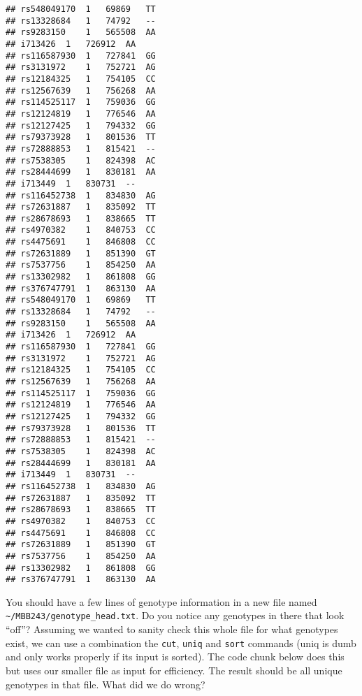 \documentclass[
]{article}
\begin{document}
\begin{verbatim}
## rs548049170  1   69869   TT
## rs13328684   1   74792   --
## rs9283150    1   565508  AA
## i713426  1   726912  AA
## rs116587930  1   727841  GG
## rs3131972    1   752721  AG
## rs12184325   1   754105  CC
## rs12567639   1   756268  AA
## rs114525117  1   759036  GG
## rs12124819   1   776546  AA
## rs12127425   1   794332  GG
## rs79373928   1   801536  TT
## rs72888853   1   815421  --
## rs7538305    1   824398  AC
## rs28444699   1   830181  AA
## i713449  1   830731  --
## rs116452738  1   834830  AG
## rs72631887   1   835092  TT
## rs28678693   1   838665  TT
## rs4970382    1   840753  CC
## rs4475691    1   846808  CC
## rs72631889   1   851390  GT
## rs7537756    1   854250  AA
## rs13302982   1   861808  GG
## rs376747791  1   863130  AA
## rs548049170  1   69869   TT
## rs13328684   1   74792   --
## rs9283150    1   565508  AA
## i713426  1   726912  AA
## rs116587930  1   727841  GG
## rs3131972    1   752721  AG
## rs12184325   1   754105  CC
## rs12567639   1   756268  AA
## rs114525117  1   759036  GG
## rs12124819   1   776546  AA
## rs12127425   1   794332  GG
## rs79373928   1   801536  TT
## rs72888853   1   815421  --
## rs7538305    1   824398  AC
## rs28444699   1   830181  AA
## i713449  1   830731  --
## rs116452738  1   834830  AG
## rs72631887   1   835092  TT
## rs28678693   1   838665  TT
## rs4970382    1   840753  CC
## rs4475691    1   846808  CC
## rs72631889   1   851390  GT
## rs7537756    1   854250  AA
## rs13302982   1   861808  GG
## rs376747791  1   863130  AA
\end{verbatim}

You should have a few lines of genotype information in a new file named
\texttt{\textasciitilde{}/MBB243/genotype\_head.txt}. Do you notice any
genotypes in there that look ``off''? Assuming we wanted to sanity check
this whole file for what genotypes exist, we can use a combination the
\texttt{cut}, \texttt{uniq} and \texttt{sort} commands (uniq is dumb and
only works properly if its input is sorted). The code chunk below does
this but uses our smaller file as input for efficiency. The result
should be all unique genotypes in that file. What did we do wrong?
\end{document}
